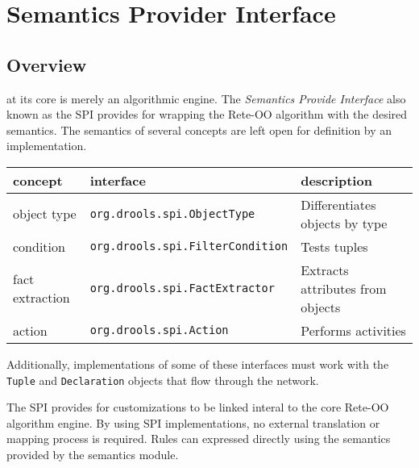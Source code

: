 \chapter{Semantics Provider Interface}

\section{Overview}

\drools{} at its core is merely an algorithmic engine. The 
\emph{Semantics Provide Interface} also known as the SPI
provides for wrapping the \drools{} Rete-OO algorithm with
the desired semantics. The semantics of several concepts are
left open for definition by an implementation.

\bigskip

\begin{center}
  \begin{tabular}{|l|l|p{120pt}|}
    \hline
      \textsf{concept} & \textsf{interface} & \textsf{description} \\
    \hline
    \hline
      \footnotesize{object type} %
        & \texttt{\footnotesize{org.drools.spi.ObjectType}} %
        & \footnotesize{Differentiates objects by type} \\
    \hline
      \footnotesize{condition} %
        & \texttt{\footnotesize{org.drools.spi.FilterCondition}} %
        & \footnotesize{Tests tuples}\\
    \hline
      \footnotesize{fact extraction} %
        & \texttt{\footnotesize{org.drools.spi.FactExtractor}} %
        & \footnotesize{Extracts attributes from objects} \\
    \hline
      \footnotesize{action} %
        & \texttt{\footnotesize{org.drools.spi.Action}} %
        & \footnotesize{Performs activities}\\
    \hline
  \end{tabular}
\end{center}

\bigskip

Additionally, implementations of some of these interfaces must work
with the \verb|Tuple| and \verb|Declaration| objects that flow 
through the network.  

The SPI provides for \drools{} customizations to be linked interal to
the core Rete-OO algorithm engine.  By using SPI implementations, no
external translation or mapping process is required.  Rules can
expressed directly using the semantics provided by the semantics module.

